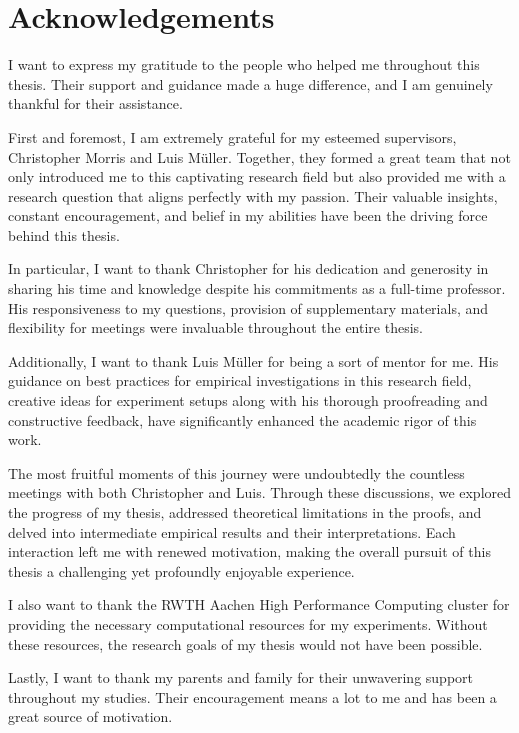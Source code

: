 \chapter*{Acknowledgements}
I want to express my gratitude to the people who helped me throughout this thesis. Their support and guidance made a huge difference, and I am genuinely thankful for their assistance.

First and foremost, I am extremely grateful for my esteemed supervisors, Christopher Morris and Luis Müller. Together, they formed a great team that not only introduced me to this captivating research field but also provided me with a research question that aligns perfectly with my passion. Their valuable insights, constant encouragement, and belief in my abilities have been the driving force behind this thesis.

In particular, I want to thank Christopher for his dedication and generosity in sharing his time and knowledge despite his commitments as a full-time professor. His responsiveness to my questions, provision of supplementary materials, and flexibility for meetings were invaluable throughout the entire thesis.

Additionally, I want to thank Luis Müller for being a sort of mentor for me. His guidance on best practices for empirical investigations in this research field, creative ideas for experiment setups along with his thorough proofreading and constructive feedback, have significantly enhanced the academic rigor of this work.

The most fruitful moments of this journey were undoubtedly the countless meetings with both Christopher and Luis. Through these discussions, we explored the progress of my thesis, addressed theoretical limitations in the proofs, and delved into intermediate empirical results and their interpretations. Each interaction left me with renewed motivation, making the overall pursuit of this thesis a challenging yet profoundly enjoyable experience.

I also want to thank the RWTH Aachen High Performance Computing cluster for providing the necessary computational resources for my experiments. Without these resources, the research goals of my thesis would not have been possible.

Lastly, I want to thank my parents and family for their unwavering support throughout my studies. Their encouragement means a lot to me and has been a great source of motivation.